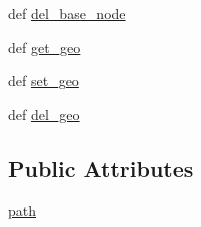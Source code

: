 \begin{DoxyCompactItemize}
\item 
def \hyperlink{classstructure_1_1_building_structure_1_1_building_structure_a919e71c56172f51e9b5c68fb00ab537a}{del\-\_\-base\-\_\-node}
\item 
def \hyperlink{classstructure_1_1_building_structure_1_1_building_structure_acbe644c4c1d7888379d542af4fbfeb79}{get\-\_\-geo}
\item 
def \hyperlink{classstructure_1_1_building_structure_1_1_building_structure_a5012995eb6702082f0ae5bdf2d300e0e}{set\-\_\-geo}
\item 
def \hyperlink{classstructure_1_1_building_structure_1_1_building_structure_af765e311450bfc91ed62fb0fb0b9ddbf}{del\-\_\-geo}
\end{DoxyCompactItemize}
\subsection*{Public Attributes}
\begin{DoxyCompactItemize}
\item 
\hyperlink{classstructure_1_1_building_structure_1_1_building_structure_a246268793e85e14f203ebd6f327b2370}{path}
\end{DoxyCompactItemize}
